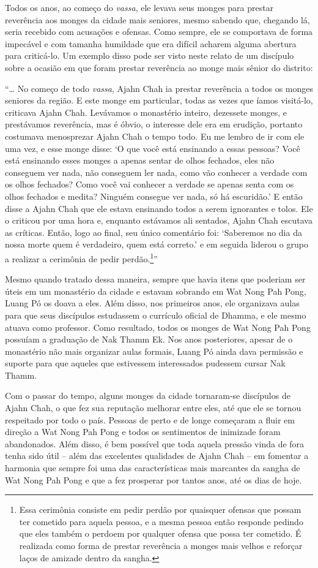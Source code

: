 Todos os anos, ao começo do \emph{vassa}, ele levava seus monges para
prestar reverência aos monges da cidade mais seniores, mesmo sabendo
que, chegando lá, seria recebido com acusações e ofensas. Como sempre,
ele se comportava de forma impecável e com tamanha humildade que era
difícil acharem alguma abertura para criticá-lo. Um exemplo disso pode
ser visto neste relato de um discípulo sobre a ocasião em que foram
prestar reverência ao monge mais sênior do distrito:

``\ldots{} No começo de todo \emph{vassa}, Ajahn Chah ia prestar
reverência a todos os monges seniores da região. E este monge em
particular, todas as vezes que íamos visitá-lo, criticava Ajahn Chah.
Levávamos o monastério inteiro, dezessete monges, e prestávamos
reverência, mas é óbvio, o interesse dele era em erudição, portanto
costumava menosprezar Ajahn Chah o tempo todo. Eu me lembro de ir com
ele uma vez, e esse monge disse: `O que você está ensinando a essas
pessoas? Você está ensinando esses monges a apenas sentar de olhos
fechados, eles não conseguem ver nada, não conseguem ler nada, como vão
conhecer a verdade com os olhos fechados? Como você vai conhecer a
verdade se apenas senta com os olhos fechados e medita? Ninguém consegue
ver nada, só há escuridão.' E então disse a Ajahn Chah que ele estava
ensinando todos a serem ignorantes e tolos. Ele o criticou por uma hora
e, enquanto estávamos ali sentados, Ajahn Chah escutava as críticas.
Então, logo ao final, seu único comentário foi: `Saberemos no dia da
nossa morte quem é verdadeiro, quem está correto.' e em seguida liderou
o grupo a realizar a cerimônia de pedir perdão.\footnote{Essa cerimônia
  consiste em pedir perdão por quaisquer ofensas que possam ter cometido
  para aquela pessoa, e a mesma pessoa então responde pedindo que eles
  também o perdoem por qualquer ofensa que possa ter cometido. É
  realizada como forma de prestar reverência a monges mais velhos e
  reforçar laços de amizade dentro da sangha.}''

Mesmo quando tratado dessa maneira, sempre que havia itens que poderiam
ser úteis em um monastério da cidade e estavam sobrando em Wat Nong Pah
Pong, Luang Pó os doava a eles. Além disso, nos primeiros anos, ele
organizava aulas para que seus discípulos estudassem o currículo oficial
de Dhamma, e ele mesmo atuava como professor. Como resultado, todos os
monges de Wat Nong Pah Pong possuíam a graduação de Nak Thamm Ek. Nos
anos posteriores, apesar de o monastério não mais organizar aulas
formais, Luang Pó ainda dava permissão e suporte para que aqueles que
estivessem interessados pudessem cursar Nak Thamm.

Com o passar do tempo, alguns monges da cidade tornaram-se discípulos de
Ajahn Chah, o que fez sua reputação melhorar entre eles, até que ele se
tornou respeitado por todo o país. Pessoas de perto e de longe começaram
a fluir em direção a Wat Nong Pah Pong e todos os sentimentos de
inimizade foram abandonados. Além disso, é bem possível que toda aquela
pressão vinda de fora tenha sido útil -- além das excelentes qualidades
de Ajahn Chah -- em fomentar a harmonia que sempre foi uma das
características mais marcantes da sangha de Wat Nong Pah Pong e que a
fez prosperar por tantos anos, até os dias de hoje.
